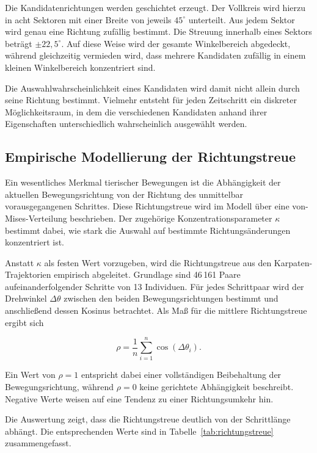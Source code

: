 \documentclass[12pt,a4paper]{report}
\begin{document}
Die Kandidatenrichtungen werden geschichtet erzeugt. Der Vollkreis wird hierzu in
acht Sektoren mit einer Breite von jeweils $45^\circ$ unterteilt. Aus jedem Sektor
wird genau eine Richtung zufällig bestimmt. Die Streuung innerhalb eines Sektors
beträgt $\pm22{,}5^\circ$. Auf diese Weise wird der gesamte Winkelbereich abgedeckt,
während gleichzeitig vermieden wird, dass mehrere Kandidaten zufällig in einem
kleinen Winkelbereich konzentriert sind.

Die Auswahlwahrscheinlichkeit eines Kandidaten wird damit nicht allein durch seine
Richtung bestimmt. Vielmehr entsteht für jeden Zeitschritt ein diskreter
Möglichkeitsraum, in dem die verschiedenen Kandidaten anhand ihrer Eigenschaften
unterschiedlich wahrscheinlich ausgewählt werden.

\subsection{Empirische Modellierung der Richtungstreue}
\label{subsec:richtungstreue}

Ein wesentliches Merkmal tierischer Bewegungen ist die Abhängigkeit der aktuellen
Bewegungsrichtung von der Richtung des unmittelbar vorausgegangenen Schrittes.
Diese Richtungstreue wird im Modell über eine von-Mises-Verteilung beschrieben.
Der zugehörige Konzentrationsparameter $\kappa$ bestimmt dabei, wie stark die
Auswahl auf bestimmte Richtungsänderungen konzentriert ist.

Anstatt $\kappa$ als festen Wert vorzugeben, wird die Richtungstreue aus den
Karpaten-Trajektorien empirisch abgeleitet. Grundlage sind 46\,161 Paare
aufeinanderfolgender Schritte von 13 Individuen. Für jedes Schrittpaar wird der
Drehwinkel $\Delta\theta$ zwischen den beiden Bewegungsrichtungen bestimmt und
anschließend dessen Kosinus betrachtet. Als Maß für die mittlere Richtungstreue
ergibt sich

\begin{equation}
\rho =
\frac{1}{n}
\sum_{i=1}^{n}
\cos(\Delta\theta_i).
\label{eq:rho_empirical}
\end{equation}

Ein Wert von $\rho=1$ entspricht dabei einer vollständigen Beibehaltung der
Bewegungsrichtung, während $\rho=0$ keine gerichtete Abhängigkeit beschreibt.
Negative Werte weisen auf eine Tendenz zu einer Richtungsumkehr hin.

Die Auswertung zeigt, dass die Richtungstreue deutlich von der Schrittlänge
abhängt. Die entsprechenden Werte sind in Tabelle~\ref{tab:richtungstreue}
zusammengefasst.
\end{document}
